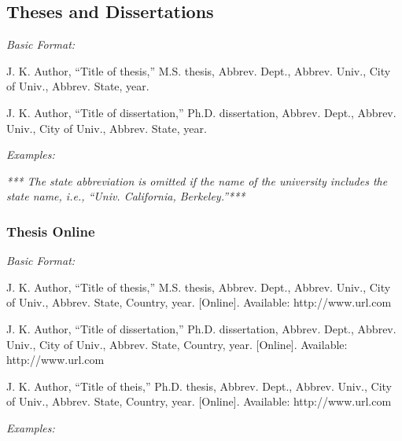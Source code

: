 \documentclass[10pt]{article}
\newcommand*{\guidelabel}[1]{\par\vspace{-4pt}\hspace*{22pt}\textit{#1}\par\vspace{-\parskip}}
\begin{document}
\subsection{Theses and Dissertations}
\guidelabel{Basic Format:}
\begin{guideitems}
  \item J. K. Author, “Title of thesis,” M.S. thesis, Abbrev. Dept., Abbrev. Univ., City of Univ., Abbrev. State, year.
  \item J. K. Author, “Title of dissertation,” Ph.D. dissertation, Abbrev. Dept., Abbrev. Univ., City of Univ., Abbrev. State, year.
\end{guideitems}
\guidelabel{Examples:}
\begin{guideitems}
  \item {}
  \item {}
  \item {} \textit{*** The state abbreviation is omitted if the name of the university includes the state name, i.e., “Univ. California, Berkeley.”***}
  \item {}
\end{guideitems}

\subsubsection{Thesis Online}
\guidelabel{Basic Format:}
\begin{guideitems}
  \item J. K. Author, “Title of thesis,” M.S. thesis, Abbrev. Dept., Abbrev. Univ., City of Univ., Abbrev. State, Country, year. [Online]. Available: http://www.url.com
  \item J. K. Author, “Title of dissertation,” Ph.D. dissertation, Abbrev. Dept., Abbrev. Univ., City of Univ., Abbrev. State, Country, year. [Online]. Available: http://www.url.com
  \item J. K. Author, “Title of theis,” Ph.D. thesis, Abbrev. Dept., Abbrev. Univ., City of Univ., Abbrev. State, Country, year. [Online]. Available: http://www.url.com
\end{guideitems}
\guidelabel{Examples:}
\begin{guideitems}
  \item {}
  \item {}
  \item {}
\end{guideitems}
\end{document}
